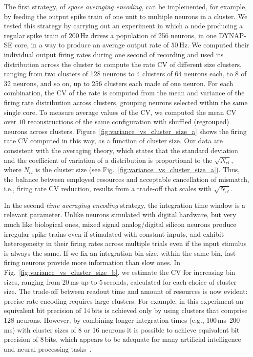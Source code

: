 The first strategy, of \emph{space averaging encoding}, can be implemented, for example, by feeding the output spike train of one unit to multiple neurons in a cluster.
We tested this strategy by carrying out an experiment in which a node producing a regular spike train of $200$\,Hz drives a population of 256 neurons, in one DYNAP-SE core, in a way to produce an average output rate of $50$\,Hz.
We computed their individual output firing rates during one second of recording and used its distribution across the cluster to compute the rate CV of different size clusters, ranging from two clusters of 128 neurons to 4 clusters of 64 neurons each, to 8 of 32 neurons, and so on, up to 256 clusters each made of one neuron.
For each combination, the CV of the rate is computed from the mean and variance of the firing rate distribution across clusters, grouping neurons selected within the same single core. 
To measure average values of the CV, we computed the mean CV over $10$ reconstructions of the same configuration with shuffled (regrouped) neurons across clusters.
Figure~\ref{fig:variance_vs_cluster_size_a} shows the firing rate CV computed in this way, as a function of cluster size.
Our data are consistent with the averaging theory, which states that the standard deviation and the coefficient of variation of a distribution is proportional to the $\sqrt{N_{cl}}$, where $N_{cl}$ is the cluster size (see Fig.~\ref{fig:variance_vs_cluster_size_a}).
Thus, the balance between employed resources and acceptable cancellation of mismatch, i.e., firing rate CV reduction, results from a trade-off that scales with $\sqrt{N_{cl}}$.


In the second \emph{time averaging encoding} strategy, the integration time window is a relevant parameter.
Unlike neurons simulated with digital hardware, but very much like biological ones, mixed signal analog/digital silicon neurons produce irregular spike trains even if stimulated with constant inputs, and exhibit heterogeneity in their firing rates across multiple trials even if the input stimulus is always the same.
If we fix an integration bin size, within the same bin, fast firing neurons provide more information than slow ones.
In Fig.~\ref{fig:variance_vs_cluster_size_b}, we estimate the CV for increasing bin sizes, ranging from 20\,ms up to 5\,seconds, calculated for each choice of cluster size.
The trade-off between readout time and amount of resources is now evident: precise rate encoding requires large clusters.
For example, in this experiment an equivalent bit precision of 14\,bits is achieved only by using clusters that comprise 128 neurons.
However, by combining longer integration times (e.g., 100\,ms--200\,ms) with cluster sizes of 8 or 16 neurons it is possible to achieve equivalent bit precision of 8\,bits, which appears to be adequate for many artificial intelligence and neural processing tasks~\cite{Pfeil_etal13,Stromatias_etal15a,Baldassi_etal16}.


